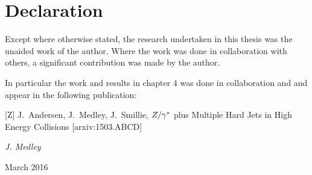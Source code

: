 \chapter*{Declaration}

\normalsize
Except where otherwise stated, the research undertaken in this thesis
was the unaided work of the author. Where the work was done in collaboration
with others, a significant contribution was made by the author.

In particular the work and results in chapter 4 was done in collaboration
and and appear in the following publication:

[Z] J.~Andersen, J.~Medley, J.~Smillie, $Z/\gamma^*$ plus Multiple Hard Jets
in High Energy Collisions [arxiv:1503.ABCD]

\vspace{20mm}
\hfill {\it J. Medley}

\hfill March 2016


